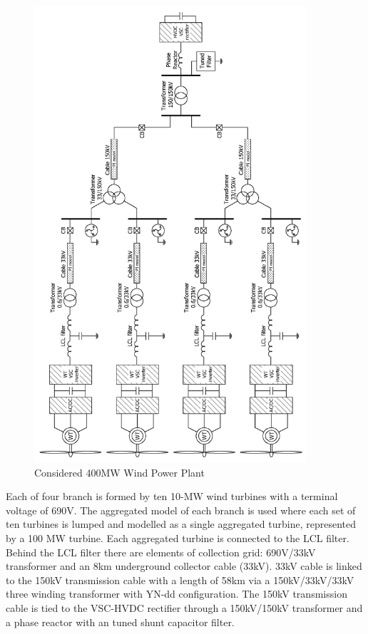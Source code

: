 \documentclass[12pt]{report} %
\begin{document}
\begin{figure}[htb]
	\centering
	\includegraphics[width=0.9\textwidth]{img/system_full.png}
  	\caption{Considered 400MW Wind Power Plant}
  	\label{fig:systemfull}
\end{figure}
\FloatBarrier

Each of four branch is formed by ten 10-MW wind turbines with a terminal voltage of 690V. The aggregated model of each branch is used where each set of ten turbines is lumped and modelled as a single aggregated turbine, represented by a 100 MW turbine. Each aggregated turbine is connected to the LCL filter. Behind the LCL filter there are elements of collection grid: 690V/33kV transformer and an 8km underground collector cable (33kV). 33kV cable is linked to the 150kV transmission cable with a length of 58km via a 150kV/33kV/33kV three winding transformer with YN-dd configuration. The 150kV transmission cable is tied to the VSC-HVDC rectifier through a 150kV/150kV transformer and a phase reactor with an tuned shunt capacitor filter.
\end{document}
